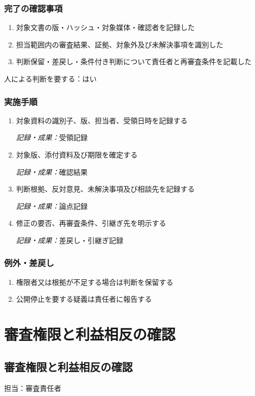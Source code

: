 \documentclass[a4paper,11pt]{article}
\begin{document}
\subsubsection*{完了の確認事項}
\begin{enumerate}[leftmargin=2em,itemsep=0.35em]
\item 対象文書の版・ハッシュ・対象媒体・確認者を記録した
\item 担当範囲内の審査結果、証拠、対象外及び未解決事項を識別した
\item 判断保留・差戻し・条件付き判断について責任者と再審査条件を記載した
\end{enumerate}
\par 人による判断を要する：はい\par\medskip
\subsubsection*{実施手順}
\begin{enumerate}[leftmargin=2em,itemsep=0.65em]
\item 対象資料の識別子、版、担当者、受領日時を記録する\par\noindent\textit{記録・成果：}受領記録\nobreak\smallskip
\item 対象版、添付資料及び期限を確定する\par\noindent\textit{記録・成果：}確認結果\nobreak\smallskip
\item 判断根拠、反対意見、未解決事項及び相談先を記録する\par\noindent\textit{記録・成果：}論点記録\nobreak\smallskip
\item 修正の要否、再審査条件、引継ぎ先を明示する\par\noindent\textit{記録・成果：}差戻し・引継ぎ記録\nobreak\smallskip
\end{enumerate}
\subsubsection*{例外・差戻し}
\begin{enumerate}[leftmargin=2em,itemsep=0.35em]
\item 権限者又は根拠が不足する場合は判断を保留する
\item 公開停止を要する疑義は責任者に報告する
\end{enumerate}
\section{審査権限と利益相反の確認}
\subsection{審査権限と利益相反の確認}
\par 担当：審査責任者\par\medskip
\end{document}
